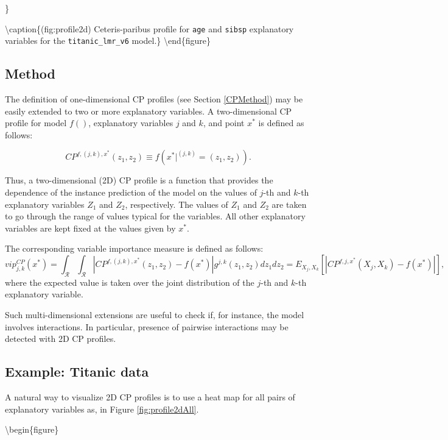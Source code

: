 \documentclass[12pt,]{krantz}
\theoremstyle{definition}
\theoremstyle{definition}
\theoremstyle{definition}
\theoremstyle{remark}
\begin{document}
\}

\textbackslash{}caption\{(fig:profile2d) Ceteris-paribus profile for
\texttt{age} and \texttt{sibsp} explanatory variables for the
\texttt{titanic\_lmr\_v6} model.\}\label{fig:profile2d}
\textbackslash{}end\{figure\}

\hypertarget{ceterisParibus2dMethod}{%
\subsection{Method}\label{ceterisParibus2dMethod}}

The definition of one-dimensional CP profiles (see Section
\ref{CPMethod}) may be easily extended to two or more explanatory
variables. A two-dimensional CP profile for model \(f()\), explanatory
variables \(j\) and \(k\), and point \(x^*\) is defined as follows:

\[
CP^{f, (j,k), x^*}(z_1, z_2) \equiv f(x^*|^{(j,k)} = (z_1,z_2)).
\]

Thus, a two-dimensional (2D) CP profile is a function that provides the
dependence of the instance prediction of the model on the values of
\(j\)-th and \(k\)-th explanatory variables \(Z_1\) and \(Z_2\),
respectively. The values of \(Z_1\) and \(Z_2\) are taken to go through
the range of values typical for the variables. All other explanatory
variables are kept fixed at the values given by \(x^*\).

The corresponding variable importance measure is defined as follows: \[
vip^{CP}_{j,k}(x^*) = \int_{\mathcal R}\int_{\mathcal R} |CP^{f,(j,k),x^*}(z_1,z_2) - f(x^*)| g^{j,k}(z_1,z_2)dz_1dz_2=E_{X_j,X_k}[|CP^{f,j,x^*}(X_j,X_k) - f(x^*)|],
\] where the expected value is taken over the joint distribution of the
\(j\)-th and \(k\)-th explanatory variable.

Such multi-dimensional extensions are useful to check if, for instance,
the model involves interactions. In particular, presence of pairwise
interactions may be detected with 2D CP profiles.

\hypertarget{ceterisParibus2dExample}{%
\subsection{Example: Titanic data}\label{ceterisParibus2dExample}}

A natural way to visualize 2D CP profiles is to use a heat map for all
pairs of explanatory variables as, in Figure \ref{fig:profile2dAll}.

\textbackslash{}begin\{figure\}
\end{document}
